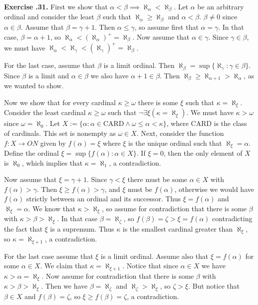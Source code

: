 \documentclass{report}
\theoremstyle{definition}
\theoremstyle{remark}
\newenvironment{exc}[1]{\noindent\textbf{Exercise \thesection.#1.}}{\medskip}
\newcommand{\set}[1]{\{#1\}}
\newcommand{\CARD}{\mathrm{CARD}}
\begin{document}
\begin{exc}{31}
    First we show that $\alpha < \beta \implies \aleph_\alpha < \aleph_\beta$. Let $\alpha$ be an arbitrary ordinal and consider the least $\beta$ such that $\aleph_\alpha \geq \aleph_\beta$ and $\alpha < \beta$. $\beta \neq 0$ since $\alpha \in \beta$. Assume that $\beta = \gamma + 1$. Then $\alpha \leq \gamma$, so assume first that $\alpha = \gamma$. In that case, $\beta = \alpha + 1$, so $\aleph_\alpha < (\aleph_\alpha)^+ = \aleph_\beta$. Now assume that $\alpha \in \gamma$. Since $\gamma \in \beta$, we must have $\aleph_\alpha < \aleph_\gamma < (\aleph_\gamma)^+ = \aleph_\beta$.
    
    For the last case, assume that $\beta$ is a limit ordinal. Then $\aleph_\beta = \sup\set{\aleph_\gamma : \gamma \in \beta}$. Since $\beta$ is a limit and $\alpha \in \beta$ we also have $\alpha + 1 \in \beta$. Then $\aleph_\beta \geq \aleph_{\alpha + 1} > \aleph_\alpha$, as we wanted to show.
    
    Now we show that for every cardinal $\kappa \geq \omega$ there is some $\xi$ such that $\kappa = \aleph_\xi$. Consider the least cardinal $\kappa \geq \omega$ such that $\neg \exists \xi (\kappa = \aleph_\xi)$. We must have $\kappa > \omega$ since $\omega = \aleph_0$. Let $X := \set{\alpha : \alpha \in \CARD\land \omega \leq \alpha < \kappa}$, where $\CARD$ is the class of cardinals. This set is nonempty as $\omega \in X$. Next, consider the function $f : X \to ON$ given by $f(\alpha) = \xi$ where $\xi$ is the unique ordinal such that $\aleph_\xi = \alpha$. Define the ordinal $\xi = \sup\set{f(\alpha) : \alpha \in X}$. If $\xi = 0$, then the only element of $X$ is $\aleph_0$, which implies that $\kappa = \aleph_1$, a contradiction. 
    
    Now assume that $\xi = \gamma + 1$. Since $\gamma < \xi$ there must be some $\alpha \in X$ with $f(\alpha) > \gamma$. Then $\xi \geq f(\alpha) > \gamma$, and $\xi$ must be $f(\alpha)$, otherwise we would have $f(\alpha)$ strictly between an ordinal and its successor. Thus $\xi = f(\alpha)$ and $\aleph_\xi = \alpha$. We know that $\kappa > \aleph_\xi$, so assume for contradiction that there is some $\beta$ with $\kappa > \beta > \aleph_\xi$.
    In that case $\beta = \aleph_\zeta$, so $f(\beta) = \zeta > \xi = f(\alpha)$ contradicting the fact that $\xi$ is a supremum. Thus $\kappa$ is the smallest cardinal greater than $\aleph_\xi$, so $\kappa = \aleph_{\xi + 1}$, a contradiction.
    
    For the last case assume that $\xi$ is a limit ordinal. Assume also that $\xi = f(\alpha)$ for some $\alpha \in X$. We claim that $\kappa = \aleph_{\xi + 1}$. Notice that since $\alpha \in X$ we have $\kappa > \alpha = \aleph_\xi$. Now assume for contradiction that there is some $\beta$ with $\kappa > \beta > \aleph_\xi$. Then we have $\beta = \aleph_\zeta$ and $\aleph_\zeta > \aleph_\xi$, so $\zeta > \xi$. But notice that $\beta \in X$ and $f(\beta) = \zeta$, so $\xi \geq f(\beta) = \zeta$, a contradiction. 
    

\end{exc}
\end{document}
